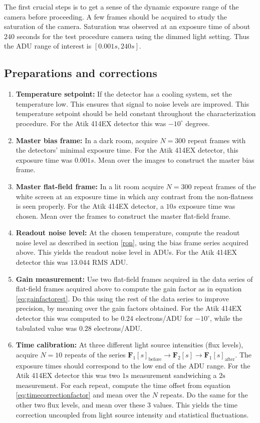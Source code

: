 \documentclass[../main.tex]{subfiles}
\begin{document}
		The first crucial steps is to get a sense of the dynamic exposure range of the camera before proceeding. A few frames should be acquired to study the saturation of the camera. Saturation was observed at an exposure time of about $240$ seconds for the test procedure camera using the dimmed light setting. Thus the ADU range of interest is $[0.001s, 240s]$.
		
		\subsection{Preparations and corrections}
		\begin{enumerate}
			\item \textbf{Temperature setpoint:} If the detector has a cooling system, set the temperature low. This ensures that signal to noise levels are improved. This temperature setpoint should be held constant throughout the characterization procedure. For the Atik 414EX detector this was $-10^\circ$ degrees.
			\item \textbf{Master bias frame:} In a dark room, acquire $N=300$ repeat frames with the detectors' minimal exposure time. For the Atik 414EX detector, this exposure time was $0.001s$. Mean over the images to construct the master bias frame.
			\item \textbf{Master flat-field frame:} In a lit room acquire $N=300$ repeat frames of the white screen at an exposure time in which any contrast from the non-flatness is seen properly. For the Atik 414EX detector, a $10s$ exposure time was chosen. Mean over the frames to construct the master flat-field frame.
			\item \textbf{Readout noise level:} At the chosen temperature, compute the readout noise level as described in section \ref{ron}, using the bias frame series acquired above. This yields the readout noise level in ADUs. For the Atik 414EX detector this was $13.044$ RMS ADU.
			\item \textbf{Gain measurement:} Use two flat-field frames acquired in the data series of flat-field frames acquired above to compute the gain factor as in equation \ref{eq:gainfactorest}. Do this using the rest of the data series to improve precision, by meaning over the gain factors obtained. For the Atik 414EX detector this was computed to be $0.24$  electrons/ADU for $-10^\circ$, while the tabulated value \cite{atik414specs} was  $0.28$  electrons/ADU.
			\item \textbf{Time calibration:} 
			At three different light source intensities (flux levels), acquire  $N=10$ repeats of the series $\bm F_1[s]_\text{before} \rightarrow \bm F_2[s] \rightarrow \bm F_1[s]_\text{after}$. The exposure times should correspond to the low end of the ADU range. For the Atik 414EX detector this was two $1\text{s}$ measurement sandwiching a $2\text{s}$ measurement. For each repeat, compute the time offset from equation \ref{eq:timecorrectionfactor} and mean over the $N$ repeats. Do the same for the other two flux levels, and mean over these $3$ values. This yields the time correction uncoupled from light source intensity and statistical fluctuations.

\end{enumerate}
\end{document}
